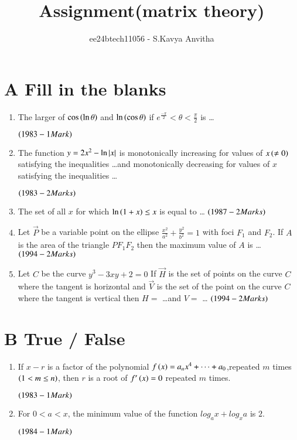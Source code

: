 \documentclass[journal,12pt,onecolumn]{IEEEtran}
\theoremstyle{remark}
\begin{document}

\vspace{3cm}

\title{Assignment(matrix theory)}
\author{ee24btech11056 - S.Kavya Anvitha}
\maketitle
\section{A Fill in the blanks}

\begin{enumerate}
\item The larger of $\cos \left(\ln \theta\right)$ and 
$\ln \left(\cos \theta\right)$ if  $e^{\frac{-\pi}{2}}< \theta< \frac{\pi}{2}$
is \dots

\hfill$\left(1983 - 1 Mark\right)$


\item The function $y=2x^{2}-\ln \left\vert x\right\vert$
is monotonically increasing for values of $x\left(\neq0\right)$ satisfying
the inequalities \dots and monotonically decreasing for values of $x$
satisfying the inequalities \dots

\hfill$\left(1983 - 2 Marks\right)$
	
\item The set of all $x$ for which $\ln \left(1+x\right) \leq x$
is equal to \dots
\hfill$\left(1987 - 2 Marks\right)$

\item Let $\vec P$ be a variable point on the ellipse
$\frac{x^2}{a^2}+\frac{y^2}{b^2} = 1$
with foci $F_1$ and $F_2$. If $A$ is the area of the triangle $PF_1F_2$ 
then the maximum value of $A$ is \dots
\hfill$\left(1994 - 2 Marks\right)$

\item Let $C$ be the curve $y^3 - 3xy + 2 = 0$ If $\vec H$ is the set 
of points on the curve $C$ where the tangent is horizontal and $\vec V$ is
the set of the point on the curve $C$ where the tangent is vertical
then $H =$ \dots and $V =$ \dots
\hfill$\left(1994 - 2 Marks\right)$
\end{enumerate}

\section{B True / False}

\begin{enumerate}

\item If $x-r$ is a factor of the polynomial
$f\left(x\right) = a_{n}x^{4}+\dots+a_{0}$,repeated $m$ times $\left(1< m\leq n\right)$, 
then $r$ is a root of $f^\prime\left(x\right)=0$ repeated $m$ times.

\hfill$\left(1983 - 1 Mark\right)$

\item For $0 < a < x$, the minimum value of the function 
$log_a x + log_x a$ is $2$. 

\hfill$\left(1984 - 1 Mark\right)$

\end{enumerate}
\end{document}
